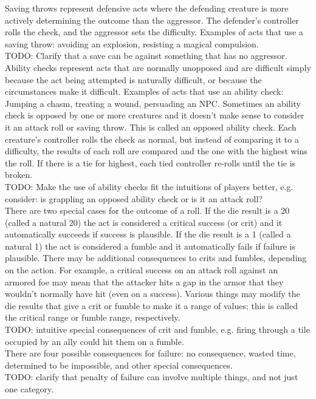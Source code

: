 \documentclass[letterpaper,titlepage,openany,twocolumn]{book}
\begin{document}
Saving throws represent defensive acts where the defending creature is more actively determining the outcome than the aggressor. The defender’s controller rolls the check, and the aggressor sets the difficulty. Examples of acts that use a saving throw: avoiding an explosion, resisting a magical compulsion.\\
TODO: Clarify that a save can be against something that has no aggressor.\\

Ability checks represent acts that are normally unopposed and are difficult simply because the act being attempted is naturally difficult, or because the circumstances make it difficult. Examples of acts that use an ability check: Jumping a chasm, treating a wound, persuading an NPC. Sometimes an ability check is opposed by one or more creatures and it doesn’t make sense to consider it an attack roll or saving throw. This is called an opposed ability check. Each creature’s controller rolls the check as normal, but instead of comparing it to a difficulty, the results of each roll are compared and the one with the highest wins the roll. If there is a tie for highest, each tied controller re-rolls until the tie is broken.\\
TODO: Make the use of ability checks fit the intuitions of players better, e.g. consider: is grappling an opposed ability check or is it an attack roll?\\

There are two special cases for the outcome of a roll. If the die result is a 20 (called a natural 20) the act is considered a critical success (or crit) and it automatically succeeds if success is plausible. If the die result is a 1 (called a natural 1) the act is considered a fumble and it automatically fails if failure is plausible. There may be additional consequences to crits and fumbles, depending on the action. For example, a critical success on an attack roll against an armored foe may mean that the attacker hits a gap in the armor that they wouldn’t normally have hit (even on a success). Various things may modify the die results that give a crit or fumble to make it a range of values; this is called the critical range or fumble range, respectively.\\
TODO: intuitive special consequences of crit and fumble, e.g. firing through a tile occupied by an ally could hit them on a fumble.\\

There are four possible consequences for failure: no consequence, wasted time, determined to be impossible, and other special consequences.\\
TODO: clarify that penalty of failure can involve multiple things, and not just one category.\\
\end{document}
